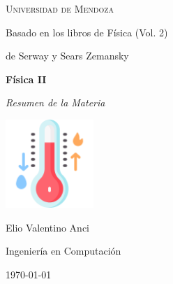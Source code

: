 \documentclass[a4paper,12pt]{article}  %
\begin{document}
  \begin{titlepage}
    \centering
    \vspace*{2cm} %

    {\scshape\LARGE Universidad de Mendoza\par}
    \vspace{2cm}
    {\large Basado en los libros de Física (Vol. 2)\par}
    {\large de Serway y Sears Zemansky\par}
    \vspace{1.5cm}

    {\Huge\bfseries Física II\par}
    \vspace{0.5cm}
    {\Large\itshape Resumen de la Materia\par} %

    \vspace{1.5cm}
    \includegraphics[width=0.25\textwidth]{images/cover.png} %
    \vspace{1.5cm}

    {\Large Elio Valentino Anci\par}
    {\large Ingeniería en Computación\par}

    \vfill

    {\large \today\par}
  \end{titlepage}

  \newpage

  \tableofcontents  %

  \newpage

  
  \newpage
  
  \newpage
  
  \newpage
  
  \newpage
  
  \newpage
  
  \newpage
  
  \newpage
  
  \newpage
  
  \newpage
\end{document}
